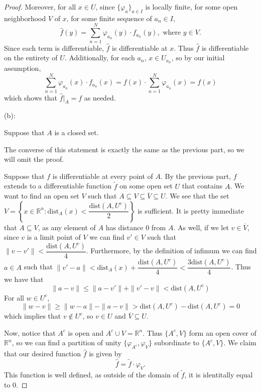 \documentclass{article}
\newcommand{\cl}[1]{\overline{#1}}
\theoremstyle{plain} %
\numberwithin{thm}{section} %
\theoremstyle{definition}
\begin{document}
\begin{proof}
            Moreover, for all \(x \in U\), since \(\{ \varphi _a \}_{a \in I}\) is locally finite, for some open neighborhood \(V\) of \(x\), for some finite sequence of \(a_n \in I\),
            \[
                \hat{f}(y) = \sum_{n=1}^{N} \varphi _{a_n} (y) \cdot f_{a_n}(y), \text{ where } y \in V.
            \]
            Since each term is differentiable, \(\hat{f}\) is differentiable at \(x\). Thus \(\hat{f}\) is differentiable on the entirety of \(U\). Additionally, for each \(a_n\), \(x \in U_{a_n}\), so by our initial assumption,
            \[
                \sum_{n=1}^{N} \varphi _{a_n} (x) \cdot f_{a_n}(x) = f(x) \cdot \sum_{n=1}^{N} \varphi _{a_n} (x) = f(x)
            \]
            which shows that \(\hat{f}\vert _A = f\) as needed.
    
            \medskip
    
            (b):
    
            Suppose that \(A\) is a closed set.
    
            The converse of this statement is exactly the same as the previous part, so we will omit the proof.
    
            Suppose that \(f\) is differentiable at every point of \(A\). By the previous part, \(f\) extends to a differentiable function \(\widetilde{f}\) on some open set \(U\) that contains \(A\). We want to find an open set \(V\) such that \(A \subseteq V \subseteq \cl{V} \subseteq U\). We see that the set \(V = \left\{ x \in \mathbb{R}^n : \mathrm{dist}_A (x) < \dfrac{\mathrm{dist}(A, U^c)}{2}\right\}\) is sufficient. It is pretty immediate that \(A \subseteq V\), as any element of \(A\) has distance 0 from \(A\). As well, if we let \(v \in \cl{V}\), since \(v\) is a limit point of \(V\) we can find \(v' \in V\) such that \(\|v - v'\| < \dfrac{\mathrm{dist}(A, U^c)}{4}\). Furthermore, by the definition of infimum we can find \(a \in A\) such that \(\|v' - a \| < \mathrm{dist}_A (x) +  \dfrac{\mathrm{dist}(A, U^c)}{4} < \dfrac{3\mathrm{dist}(A, U^c)}{4}\). Thus we have that
            \[
                \|a - v\| \leq \|a - v'\| + \|v' - v\| < \mathrm{dist}(A, U^c)
            \]
            For all \(w \in U^c\),
            \[
                \|w - v\| \geq \|w - a\| - \|a - v\| > \mathrm{dist}(A, U^c) - \mathrm{dist}(A, U^c) = 0
            \]
            which implies that \(v \notin U^c\), so \(v \in U\) and \(\cl{V} \subseteq U\).
            
            Now, notice that \(A^c\) is open and \(A^c \cup V = \mathbb{R}^n\). Thus \(\{ A^c, V \}\) form an open cover of \(\mathbb{R}^n\), so we can find a partition of unity \(\{\varphi_{A^c}, \varphi_{V}\}\) subordinate to \(\{ A^c, V \}\). We claim that our desired function \(\widehat{f}\) is given by
            \[
                \widehat{f} = \widetilde{f} \cdot \varphi_{V}.
            \]
            This function is well defined, as outside of the domain of \(\widetilde{f}\), it is identitally equal to 0.
    

\end{proof}
\end{document}
